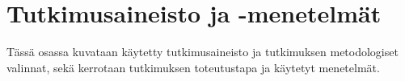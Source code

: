 \section{Tutkimusaineisto ja -menetelmät}

Tässä osassa kuvataan käytetty tutkimusaineisto ja tutkimuksen metodologiset
valinnat, sekä kerrotaan tutkimuksen toteutustapa ja käytetyt menetelmät.